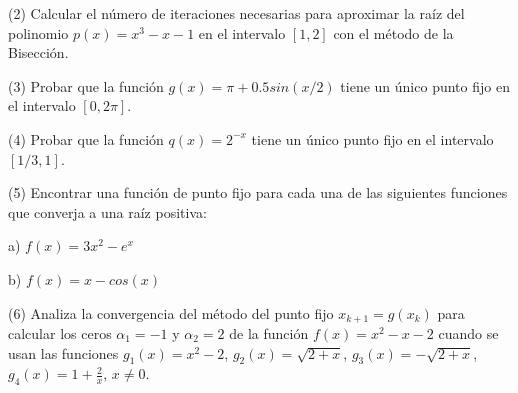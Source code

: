 \noindent (2) Calcular el número de iteraciones necesarias para aproximar la raíz del polinomio $p(x) = x^3 - x - 1$ en el intervalo $[1, 2]$ con el método de la Bisección.

\noindent (3) Probar que la función $g(x) = \pi + 0.5 sin(x/2)$ tiene un único punto fijo en el intervalo $[0, 2\pi]$.

\noindent (4) Probar que la función $q(x) = 2^{-x}$ tiene un único punto fijo en el intervalo $[1/3, 1]$.

\noindent (5) Encontrar una función de punto fijo para cada una de las siguientes funciones que converja a una raíz positiva:

a) $f(x) = 3 x^2 - e^x$

b) $f(x) = x - cos(x)$

\noindent (6) Analiza la convergencia del método del punto fijo $x_{k + 1} = g(x_k)$ para calcular los ceros $\alpha_1 = -1$ y $\alpha_2 = 2$ de la función $f(x) = x^2 - x - 2$ cuando se usan las funciones $g_1(x) = x^2 - 2$, $g_2(x) = \sqrt{2 + x}$, $g_3(x) = - \sqrt{2 + x}$, $g_4(x) = 1 + \frac{2}{x}$, $x \neq 0$.